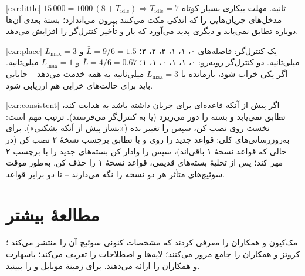 \documentclass[11pt,a4paper]{article}
\begin{document}
\begin{solutionbox}{\ref{exr:little}}
$15\,000 = 1000\,(8 + T_{\mathrm{idle}}) \Rightarrow T_{\mathrm{idle}} = 7$ ثانیه. مهلت بیکاری بسیار کوتاه مدخل‌های جریان‌هایی را که
اندکی مکث می‌کنند بیرون می‌اندازد؛ بستهٔ بعدی آن‌ها دوباره تطابق نمی‌یابد و  دیگری پدید می‌آورد که بار و تأخیر
کنترل‌گر را افزایش می‌دهد.
\end{solutionbox}

\begin{solutionbox}{\ref{exr:place}}
یک کنترل‌گر: فاصله‌های ۰، ۱، ۱، ۲، ۲، ۳؛ $\bar L = 9/6 = 1.5$ و $L_{\max} = 3$ میلی‌ثانیه. دو کنترل‌گر روبه‌رو: ۰، ۱، ۱، ۰، ۱، ۱؛
$\bar L = 4/6 = 0.67$ و $L_{\max} = 1$ میلی‌ثانیه. اگر یکی خراب شود، بازمانده با $L_{\max} = 3$ میلی‌ثانیه به همه خدمت می‌دهد --
جایابی باید برای حالت‌های خرابی هم ارزیابی شود.
\end{solutionbox}

\begin{solutionbox}{\ref{exr:consistent}}
اگر  پیش از آنکه  قاعده‌ای برای جریان داشته باشد به  هدایت کند،  تطابق نمی‌یابد و بسته را دور می‌ریزد (یا
به کنترل‌گر می‌فرستد). ترتیب مهم است: نخست روی  نصب کن، سپس  را تغییر بده («بساز پیش از آنکه بشکنی»). برای
به‌روزرسانی‌های کلی: قواعد جدید را روی  و  با تطابق برچسب نسخهٔ ۲ نصب کن (در حالی که قواعد نسخهٔ ۱ باقی‌اند)، سپس
 را وادار کن بسته‌های جدید را با برچسب ۲ مهر کند؛ پس از تخلیهٔ بسته‌های قدیمی، قواعد نسخهٔ ۱ را حذف کن. به‌طور موقت
سوئیچ‌های متأثر هر دو نسخه را نگه می‌دارند -- تا دو برابر قواعد.
\end{solutionbox}

\section{مطالعهٔ بیشتر}
مک‌کیون و همکاران \cite{mckeown2008openflow}  را معرفی کردند که مشخصات کنونی سوئیچ آن را  منتشر
می‌کند \cite{onf2015openflow}؛ کروتز و همکاران \cite{kreutz2015sdn}  را جامع مرور می‌کنند؛ 
\cite{rfc7426} لایه‌ها و اصطلاحات  را تعریف می‌کند؛ باسهارت و همکاران \cite{bosshart2014p4}  را ارائه
می‌دهند. برای زمینهٔ موبایل  \cite{ts23214} و  \cite{ts29244} را ببینید.

\begin{latin}
\printbibliography[heading=subbibliography,title={References}]
\end{latin}
\end{document}
